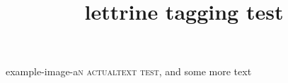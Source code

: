 \documentclass{article}
\title{lettrine tagging test}
\begin{document}
\lettrine[image,actualtext=A]{example-image-a}{n actualtext test}, and some more text
\end{document}
